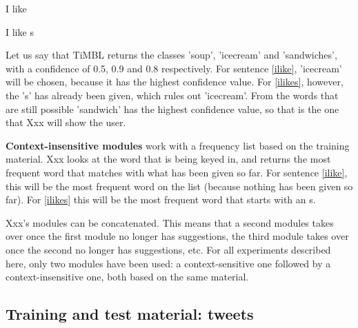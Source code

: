 \documentclass[11pt]{article}
\begin{document}
\begin{examples}
\item I like \label{ilike}
\item I like s \label{ilikes}
\end{examples}

Let us say that TiMBL returns the classes 'soup', 'icecream' and 'sandwiches', with a confidence of 0.5, 0.9 and 0.8 respectively. For sentence \ref{ilike}, 'icecream' will be chosen, because it has the highest confidence value. For \ref{ilikes}, however, the 's' has already been given, which rules out 'icecream'. From the words that are still possible 'sandwich' has the highest confidence value, so that is the one that Xxx will show the user.

\textbf{Context-insensitive modules} work with a frequency list based on the training material. Xxx looks at the word that is being keyed in, and returns the most frequent word that matches with what has been given so far. For sentence \ref{ilike}, this will be the most frequent word on the list (because nothing has been given so far). For \ref{ilikes} this will be the most frequent word that starts with an s.

Xxx's modules can be concatenated. This means that a second modules takes over once the first module no longer has suggestions, the third module takes over once the second no longer has suggestions, etc. For all experiments described here, only two modules have been used: a context-sensitive one followed by a context-insensitive one, both based on the same material.

\subsection{Training and test material: tweets}

\end{document}
